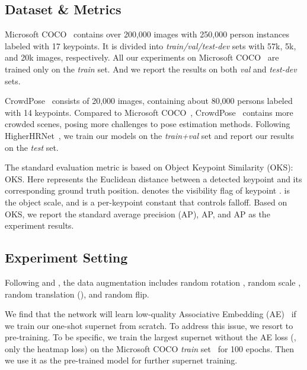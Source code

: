 \documentclass[10pt,twocolumn,letterpaper]{article}
\begin{document}
\subsection{Dataset \& Metrics}

 Microsoft COCO~\cite{lin2014microsoft} contains over 200,000 images with 250,000 person instances labeled with 17 keypoints. It is divided into \textit{train/val/test-dev} sets with 57k, 5k, and 20k images, respectively. All our experiments on Microsoft COCO~\cite{lin2014microsoft} are trained only on the \textit{train} set. And we report the results on both \textit{val} and \textit{test-dev} sets.

 CrowdPose~\cite{li2019crowdpose} consists of 20,000 images, containing about 80,000 persons labeled with 14 keypoints. Compared to Microsoft COCO~\cite{lin2014microsoft}, CrowdPose~\cite{li2019crowdpose} contains more crowded scenes, posing more challenges to pose estimation methods. Following HigherHRNet~\cite{cheng2020higherhrnet}, we train our models on the \textit{train+val} set and report our results on the \textit{test} set.

 The standard evaluation metric is based on Object Keypoint Similarity (OKS): OKS. Here  represents the Euclidean distance between a detected keypoint and its corresponding ground truth position.  denotes the visibility flag of keypoint .  is the object scale, and  is a per-keypoint constant that controls falloff. Based on OKS, we report the standard average precision (AP), AP, and AP as the experiment results.

\subsection{Experiment Setting}

\label{sec:exp-setting}



 Following \cite{cheng2020higherhrnet} and \cite{xiao2018simple}, the data augmentation includes random rotation , random scale , random translation (), and random flip.

 We find that the network will learn low-quality Associative Embedding (AE)~\cite{newell2016associative} if we train our one-shot supernet from scratch. To address this issue, we resort to pre-training. To be specific, we train the largest supernet without the AE loss (\ie, only the heatmap loss) on the Microsoft COCO \textit{train} set~\cite{lin2014microsoft} for 100 epochs. Then we use it as the pre-trained model for further supernet training.
\end{document}
